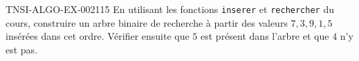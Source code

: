 \begin{exercice}{TNSI-ALGO-EX-002}{1}{15}
En utilisant les fonctions \lstinline{inserer} et \lstinline{rechercher} du cours, construire un arbre binaire de recherche à partir des valeurs $7, 3, 9, 1, 5$ insérées dans cet ordre. Vérifier ensuite que $5$ est présent dans l'arbre et que $4$ n'y est pas.
\end{exercice}
